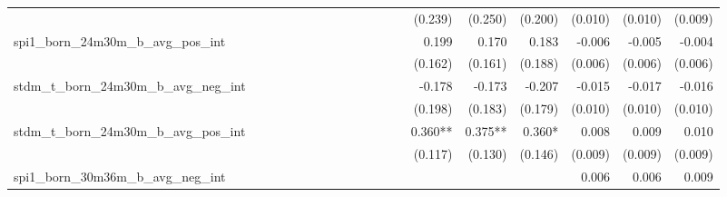 \begin{tabular}{lrrrrrrrrrrrrrrrrrr}
                                            &              &              &              &              &              &              &              &              &               &              &              &               &      (0.239) &      (0.250) &       (0.200) &      (0.010) &      (0.010) &       (0.009) \\ 
spi1\_born\_24m30m\_b\_avg\_pos\_int        &              &              &              &              &              &              &              &              &               &              &              &               &        0.199 &        0.170 &         0.183 &       -0.006 &       -0.005 &        -0.004 \\ 
                                            &              &              &              &              &              &              &              &              &               &              &              &               &      (0.162) &      (0.161) &       (0.188) &      (0.006) &      (0.006) &       (0.006) \\ 
stdm\_t\_born\_24m30m\_b\_avg\_neg\_int     &              &              &              &              &              &              &              &              &               &              &              &               &       -0.178 &       -0.173 &        -0.207 &       -0.015 &       -0.017 &        -0.016 \\ 
                                            &              &              &              &              &              &              &              &              &               &              &              &               &      (0.198) &      (0.183) &       (0.179) &      (0.010) &      (0.010) &       (0.010) \\ 
stdm\_t\_born\_24m30m\_b\_avg\_pos\_int     &              &              &              &              &              &              &              &              &               &              &              &               &      0.360** &      0.375** &        0.360* &        0.008 &        0.009 &         0.010 \\ 
                                            &              &              &              &              &              &              &              &              &               &              &              &               &      (0.117) &      (0.130) &       (0.146) &      (0.009) &      (0.009) &       (0.009) \\ 
spi1\_born\_30m36m\_b\_avg\_neg\_int        &              &              &              &              &              &              &              &              &               &              &              &               &              &              &               &        0.006 &        0.006 &         0.009 \\ 

\end{tabular}
